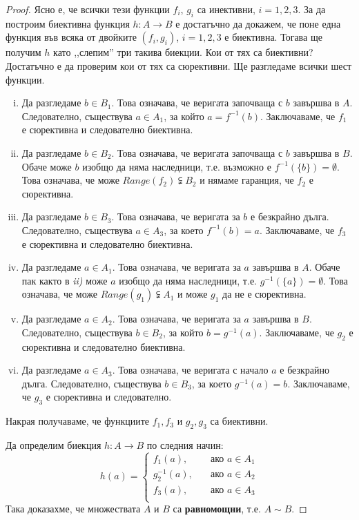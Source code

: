\begin{proof}
Ясно е, че всички тези функции $f_i$, $g_i$ са инективни, $i = 1,2,3$.
За да построим биективна функция $h:A\to B$ е достатъчно да докажем, че 
поне една функция във всяка от двойките $(f_i,g_i)$, $i = 1,2,3$ е биективна.
Тогава ще получим $h$ като ,,слепим'' три такива биекции.
Кои от тях са биективни? Достатъчно е да проверим кои от тях са сюрективни.
Ще разгледаме всички шест функции.
\begin{enumerate}[i)]
\item 
  Да разгледаме $b \in B_1$. Това означава, че веригата започваща с $b$
  завършва в $A$. Следователно, съществува 
  $a \in A_1$, за който $a = f^{-1}(b)$.
  Заключаваме, че $f_1$ е сюрективна и следователно биективна.
\item
  Да разгледаме $b \in B_2$. Това означава, че веригата започваща с $b$
  завършва в $B$.
  Обаче може $b$ изобщо да няма наследници, т.е.
  възможно е $f^{-1}(\{b\}) = \emptyset$.
  Това означава, че може $Range(f_2) \subsetneqq B_2$ и
  нямаме гаранция, че $f_2$ е сюрективна.
\item
  Да разгледаме $b \in B_3$. Това означава, че веригата за $b$
  е безкрайно дълга.
  Следователно, съществува $a \in A_3$, за което $f^{-1}(b) = a$.
  Заключаваме, че $f_3$ е сюрективна и следователно биективна.
\item
  Да разгледаме $a \in A_1$. Това означава, че веригата за $a$
  завършва в $A$. 
  Обаче пак както в {\em ii)} може $a$ изобщо да няма наследници, т.е.
  $g^{-1}(\{a\}) = \emptyset$.
  Това означава, че може $Range(g_1) \subsetneqq A_1$ и 
  може $g_1$ да не е сюрективна.
\item
  Да разгледаме $a \in A_2$. Това означава, че веригата за $a$ завършва в  $B$.
  Следователно, съществува $b \in B_2$, за който $b = g^{-1}(a)$.
  Заключаваме, че $g_2$ е сюрективна и следователно биективна.
\item
  Да разгледаме $a \in A_3$. Това означава, че веригата с начало $a$ е безкрайно дълга.
  Следователно, съществува $b \in B_3$, за което $g^{-1}(a) = b$.
  Заключаваме, че $g_3$ е сюрективна и следователно.
\end{enumerate}

Накрая получаваме, че функциите $f_1,f_3$ и $g_2,g_3$ са биективни.

Да определим биекция $h:A\rightarrow B$ по следния начин:
\[
h(a) =
\begin{cases}
  f_1(a),     & \quad \text{ако $a\in A_1$}\\
  g^{-1}_2(a), & \quad \text{ако $a\in A_2$}\\
  f_3(a),     & \quad \text{ако $a\in A_3$}\\
\end{cases}
\]
Така доказахме, че множествата $A$ и $B$ са {\bf равномощни}, т.е. $A \sim B$.
\end{proof}

